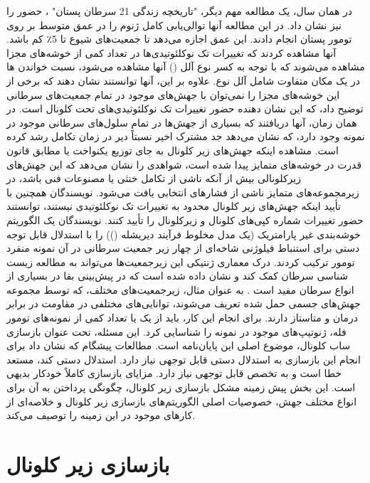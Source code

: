 در همان سال، یک مطالعه مهم دیگر، "تاریخچه زندگی 21 سرطان پستان" \cite{nik2012life}، حضور  را نیز نشان داد. در این مطالعه آنها توالی‌یابی کامل ژنوم را در عمق متوسط  بر روی تومور پستان  انجام دادند. این عمق اجازه می‌دهد تا جمعیت‌های شیوع تا 5٪ کم باشد. آنها مشاهده کردند که تغییرات تک نوکلئوتیدی‌ها در تعداد کمی از خوشه‌های مجزا مشاهده می‌شوند که با توجه به کسر نوع آلل () آنها مشاهده می‌شود، نسبت خواندن ها در یک مکان متفاوت شامل آلل نوع. علاوه بر این، آنها توانستند نشان دهند که برخی از این خوشه‌های مجزا را نمی‌توان با جهش‌های موجود در تمام جمعیت‌های سرطانی توضیح داد، که این نشان دهنده حضور تغییرات تک نوکلئوتیدی‌های تحت کلونال است. در همان زمان، آنها دریافتند که بسیاری از جهش‌ها در تمام سلول‌های سرطانی موجود در نمونه وجود دارد، که نشان می‌دهد جد مشترک اخیر نسبتاً دیر در زمان تکامل رشد کرده است. مشاهده اینکه جهش‌های زیر کلونال به جای توزیع یکنواخت یا مطابق قانون قدرت در خوشه‌های متمایز پیدا شده است، شواهدی را نشان می‌دهد که این جهش‌های زیرکلونالی بیش از آنکه ناشی از تکامل خنثی یا مصنوعات فنی باشد، در زیرمجموعه‌های متمایز ناشی از فشارهای انتخابی یافت می‌شود. نویسندگان همچنین با تأیید اینکه جهش‌های زیر کلونال محدود به تغییرات تک نوکلئوتیدی  نیستند، توانستند حضور تغییرات شماره کپی‌های کلونال و زیرکلونال را تأیید کنند. نویسندگان یک الگوریتم خوشه‌بندی غیر پارامتریک (یک مدل مخلوط فرآیند دیریشله ()) را با استدلال قابل توجه دستی برای استنباط فیلوژنی شاخه‌ای از چهار زیر جمعیت سرطانی در آن نمونه منفرد تومور ترکیب کردند. درک معماری ژنتیکی این زیرجمعیت‌ها می‌تواند به مطالعه زیست شناسی سرطان کمک کند و نشان داده شده است که در پیش‌بینی بقا در بسیاری از انواع سرطان مفید است \cite{andor2016pan}. به عنوان مثال، زیرجمعیت‌های مختلف، که توسط مجموعه جهش‌های جسمی حمل شده تعریف می‌شوند، توانایی‌های مختلفی در مقاومت در برابر درمان و متاستاز دارند. برای انجام این کار، باید از یک یا تعداد کمی از نمونه‌های تومور فله، ژنوتیپ‌های موجود در نمونه را شناسایی کرد. این مسئله، تحت عنوان بازسازی ساب کلونال، موضوع اصلی این پایان‌نامه است. مطالعات پیشگام که نشان داد  برای انجام این بازسازی به استدلال دستی قابل توجهی نیاز دارد. استدلال دستی کند، مستعد خطا است و به تخصص قابل توجهی نیاز دارد. مزایای بازسازی کاملاً خودکار بدیهی است. این بخش پیش زمینه مشکل بازسازی زیر کلونال، چگونگی پرداختن به آن برای انواع مختلف جهش، خصوصیات اصلی الگوریتم‌های بازسازی زیر کلونال و خلاصه‌ای از کارهای موجود در این زمینه را توصیف می‌کند.


\section{بازسازی زیر کلونال }

